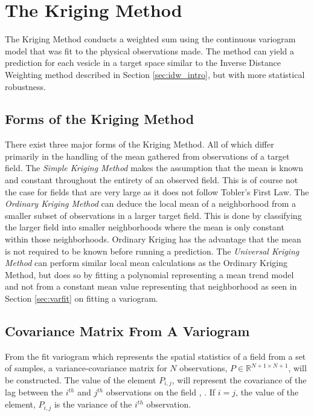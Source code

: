 \chapter{The Kriging Method}
The Kriging Method conducts a weighted sum using the continuous variogram model that was fit to the physical observations made. The method can yield a prediction for each vesicle in a target space similar to the Inverse Distance Weighting method described in Section \ref{sec:idw_intro}, but with more statistical robustness.

\section{Forms of the Kriging Method}
There exist three major forms of the Kriging Method. All of which differ primarily in the handling of the mean gathered from observations of a target field. The \textit{Simple Kriging Method} makes the assumption that the mean is known and constant throughout the entirety of an observed field. This is of course not the case for fields that are very large as it does not follow Tobler's First Law. The \textit{Ordinary Kriging Method} can deduce the local mean of a neighborhood from a smaller subset of observations in a larger target field. This is done by classifying the larger field into smaller neighborhoods where the mean is only constant within those neighborhoods. Ordinary Kriging has the advantage that the mean is not required to be known before running a prediction. The \textit{Universal Kriging Method} can perform similar local mean calculations as the Ordinary Kriging Method, but does so by fitting a polynomial representing a mean trend model and not from a constant mean value representing that neighborhood \cite{vandergraaf:nnkrig} as seen in Section \ref{sec:varfit} on fitting a variogram.

\section{Covariance Matrix From A Variogram} \label{sec:covmat}
From the fit variogram which represents the spatial statistics of a field from a set of samples, a variance-covariance matrix for $N$ observations, $P \in \mathbb{R}^{N+1 \times N+1}$, will be constructed. The value of the element $P_{i,j}$, will represent the covariance of the lag between the $i^{th}$ and $j^{th}$ observations on the field \cite{goov:97}, \cite{matheron:geostat}. If $i=j$, the value of the element, $P_{i,j}$ is the variance of the $i^{th}$ observation. 

